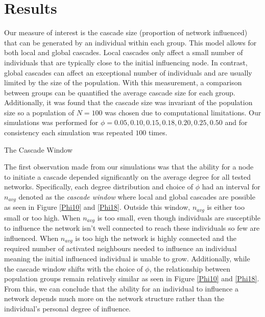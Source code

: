 \documentclass[10pt, oneside, reqno]{amsart}
\makeatletter
\theoremstyle{plain}%
\theoremstyle{definition}
\theoremstyle{remark}
\renewcommand\subsection{\@startsection{subsection}{2}%
  \z@{.5\linespacing\@plus.7\linespacing}{-.5em}%
  {\normalfont\scshape}}
\makeatother
\begin{document}
\section{Results}

Our measure of interest is the cascade size (proportion of network influenced) that can be generated by an individual within each group.
This model allows for both local and global cascades. 
Local cascades only affect a small number of individuals that are typically close to the initial influencing node. 
In contrast, global cascades can affect an exceptional number of individuals and are usually limited by the size of the population.
With this measurement, a comparison between groups can be quantified the average cascade size for each group.
Additionally, it was found that the cascade size was invariant of the population size so a population of $N=100$ was chosen due to computational limitations. Our simulations was performed for $\phi= 0.05,0.10,0.15,0.18,0.20,0.25,0.50$ and for consistency each simulation was repeated $100$ times.
 
\subsection{The Cascade Window}


The first observation made from our simulations was that the ability for a node to initiate a cascade depended significantly on the average degree for all tested networks.
Specifically, each degree distribution and choice of $\phi$ had an interval for $n_{avg}$ denoted as the \textit{cascade window} where local and global cascades are possible as seen in Figure \ref{Phi10} and \ref{Phi18}.
Outside this window, $n_{avg}$ is either too small or too high.
When $n_{avg}$ is too small, even though individuals are susceptible to influence the network isn't well connected to reach these individuals so few are influenced.
When $n_{avg}$ is too high the network is highly connected and the required number of activated neighbours needed to influence an individual meaning the initial influenced individual is unable to grow.
Additionally, while the cascade window shifts with the choice of $\phi$, the relationship between population groups remain relatively similar as seen in Figure \ref{Phi10} and \ref{Phi18}.
From this, we can conclude that the ability for an individual to influence a network depends much more on the network structure rather than the individual's personal degree of influence.


\end{document}
